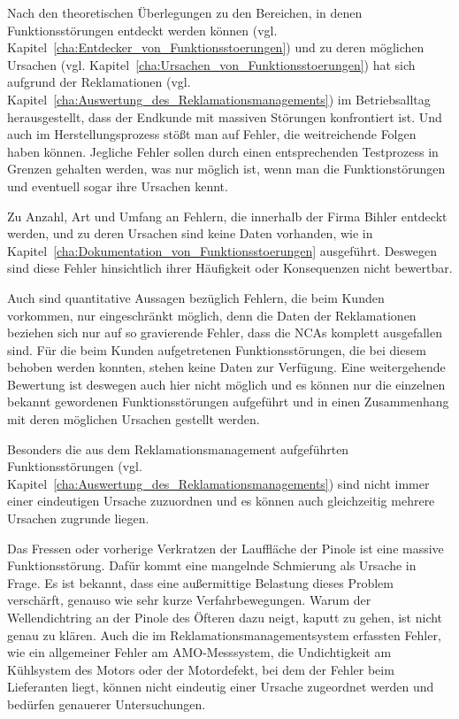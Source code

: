 Nach den theoretischen Überlegungen zu den Bereichen, in denen Funktionsstörungen entdeckt werden können (vgl. Kapitel~\ref{cha:Entdecker_von_Funktionsstoerungen}) und zu deren möglichen Ursachen (vgl. Kapitel~\ref{cha:Ursachen_von_Funktionsstoerungen}) hat sich aufgrund der Reklamationen (vgl. Kapitel~\ref{cha:Auswertung_des_Reklamationsmanagements}) im Betriebsalltag herausgestellt, dass der Endkunde mit massiven Störungen konfrontiert ist. Und auch im Herstellungsprozess stößt man auf Fehler, die weitreichende Folgen haben können. Jegliche Fehler sollen durch einen entsprechenden Testprozess in Grenzen gehalten werden, was nur möglich ist, wenn man die Funktionstörungen und eventuell sogar ihre Ursachen kennt.

Zu Anzahl, Art und Umfang an Fehlern, die innerhalb der Firma Bihler entdeckt werden, und zu deren Ursachen sind keine Daten vorhanden, wie in Kapitel~\ref{cha:Dokumentation_von_Funktionsstoerungen} ausgeführt. Deswegen sind diese Fehler hinsichtlich ihrer Häufigkeit oder Konsequenzen nicht bewertbar.

Auch sind quantitative Aussagen bezüglich Fehlern, die beim Kunden vorkommen, nur eingeschränkt möglich, denn die Daten der Reklamationen beziehen sich nur auf so gravierende Fehler, dass die NCAs komplett ausgefallen sind. Für die beim Kunden aufgetretenen Funktionsstörungen, die bei diesem behoben werden konnten, stehen keine Daten zur Verfügung. Eine weitergehende Bewertung ist deswegen auch hier nicht möglich und es können nur die einzelnen bekannt gewordenen Funktionsstörungen aufgeführt und in einen Zusammenhang mit deren möglichen Ursachen gestellt werden.
                                            




Besonders die aus dem Reklamationsmanagement aufgeführten Funktionsstörungen (vgl. Kapitel~\ref{cha:Auswertung_des_Reklamationsmanagements}) sind nicht immer einer eindeutigen Ursache zuzuordnen und es können auch gleichzeitig mehrere Ursachen zugrunde liegen.



Das Fressen oder vorherige Verkratzen der Lauffläche der Pinole ist eine massive Funktionsstörung. Dafür kommt eine mangelnde Schmierung als Ursache in Frage. Es ist bekannt, dass eine außermittige Belastung dieses Problem verschärft, genauso wie sehr kurze Verfahrbewegungen. Warum der Wellendichtring an der Pinole des Öfteren dazu neigt, kaputt zu gehen, ist nicht genau zu klären. Auch die im Reklamationsmanagementsystem erfassten Fehler, wie ein allgemeiner Fehler am AMO-Messsystem, die Undichtigkeit am Kühlsystem des Motors oder der Motordefekt, bei dem der Fehler beim Lieferanten liegt, können nicht eindeutig einer Ursache zugeordnet werden und bedürfen genauerer Untersuchungen.



